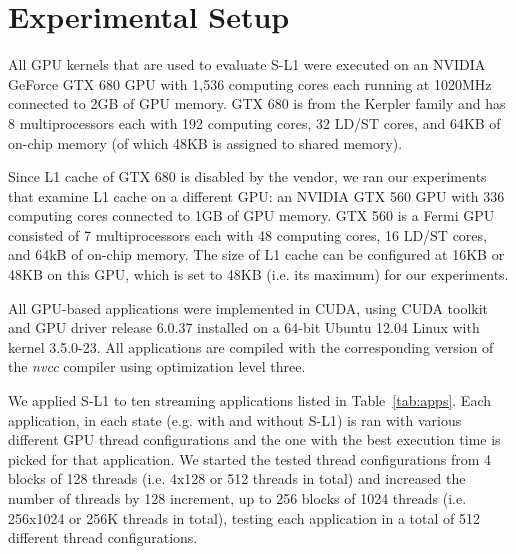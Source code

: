 \section{Experimental Setup}
\label{sec:expSetup}

All GPU kernels that are used to evaluate S-L1 were
executed on an NVIDIA GeForce GTX 680 GPU with 1,536 computing cores each running at 1020MHz
connected to 2GB of GPU memory. GTX 680 is from the Kerpler family and has 8 multiprocessors each
with 192 computing cores, 32 LD/ST cores, and 64KB of on-chip memory (of which 48KB is assigned to
shared memory).

Since L1 cache of GTX 680 is disabled by the vendor, we ran our experiments that examine L1 cache on
a different GPU: an NVIDIA GTX 560 GPU with 336 computing cores connected to 1GB of GPU memory. GTX
560 is a Fermi GPU consisted of 7 multiprocessors each with 48 computing cores, 16 LD/ST cores, and
64kB of on-chip memory. The size of L1 cache can be configured at 16KB or 48KB on this GPU, which is
set to 48KB (i.e. its maximum) for our experiments.

All GPU-based applications were implemented in CUDA, using CUDA toolkit and GPU driver release
6.0.37 installed on a 64-bit Ubuntu 12.04 Linux with kernel 3.5.0-23. All applications are compiled
with the corresponding version of the {\it nvcc} compiler using optimization level three.

We applied S-L1 to ten streaming applications listed in Table~\ref{tab:apps}. Each application, in
each state (e.g. with and without S-L1) is ran with various different GPU thread configurations and
the one with the best execution time is picked for that application. We started the tested thread
configurations from 4 blocks of 128 threads (i.e. 4x128 or 512 threads in total) and increased the
number of threads by 128 increment, up to 256 blocks of 1024 threads (i.e. 256x1024 or 256K threads
in total), testing each application in a total of 512 different thread configurations.


